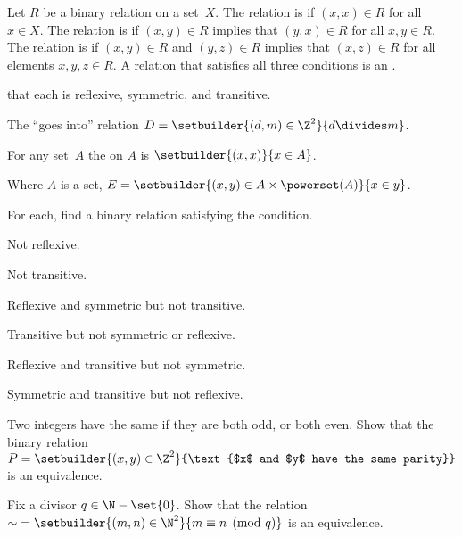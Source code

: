 \documentclass{ibl}
\begin{document}
\begin{df} 
Let $R$ be a binary relation on a set~$X$.
The relation is  if $(x,x)\in R$ for all $x\in X$.
The relation is  if $(x,y)\in R$ implies that
$(y,x)\in R$ for all $x,y\in R$.
The relation is  if 
$(x,y)\in R$ and $(y,z)\in R$ implies that 
$(x,z)\in R$ for all elements $x,y,z\in R$.
A relation that satisfies all three conditions is an
.  
\end{df}

\begin{ex}   \pord{} that each is reflexive, symmetric, and transitive.
\begin{exes}
\item The ``goes into'' relation
  $D=\setbuilder{(d,m)\in\Z^2}{d\divides m}$.
\item
  For any set~$A$ the  on $A$ 
  is $\setbuilder{(x,x)}{x\in A}$. 
\item
  Where $A$ is a set,
  $E=\setbuilder{(x,y)\in A\times\powerset(A)}{x\in y}$.
\end{exes}
\end{ex}

\begin{ex} For each, find a binary relation satisfying the condition.
\begin{exes}
\item Not reflexive.
\item Not transitive.
\item Reflexive and symmetric but not transitive.
\item Transitive but not symmetric or reflexive.
\item Reflexive and transitive but not symmetric.
\item Symmetric and transitive but not reflexive. 
\end{exes}
\end{ex}

\begin{ex}
Two integers have the same  if they are both odd, or 
both even.
Show that the binary relation 
$P=\setbuilder{(x,y)\in\Z^2}{\text{$x$ and $y$ have the same parity}}$  
is an equivalence.
\end{ex}

\begin{ex}
Fix a divisor $q\in\N-\set{0}$.
Show that the relation 
$\mathord\sim=\setbuilder{(m,n)\in\N^2}{m\equiv n\pmod q}$  
is an equivalence.
\end{ex}
\end{document}
